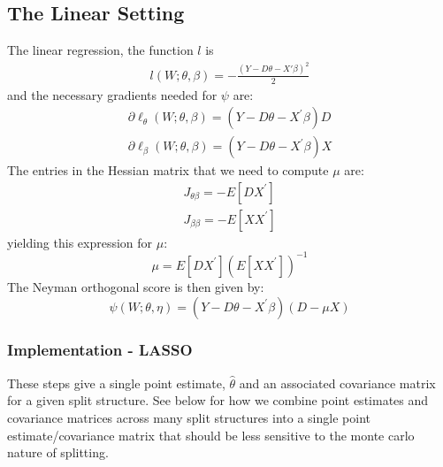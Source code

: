 \documentclass[11pt]{article}
\begin{document}
\subsection{The Linear Setting}
The linear regression, the function $l$ is
\begin{gather*}
	l(W; \theta, \beta) = -\frac{(Y - D\theta - X'\beta)^2}{2}
\end{gather*}
and the necessary gradients needed for $\psi$ are:
\begin{gather*}
	\partial \ell_{\theta}(W ; \theta, \beta)=\left(Y-D \theta-X^{\prime} \beta\right) D \\
  \partial \ell_{\beta}(W ; \theta, \beta)=\left(Y-D \theta-X^{\prime} \beta\right) X
\end{gather*}
The entries in the Hessian matrix that we need to compute $\mu$ are:
\begin{gather*}
	J_{\theta \beta}=-E\left[D X^{\prime}\right] \\
  J_{\beta \beta}=-E\left[X X^{\prime}\right]
\end{gather*}
yielding this expression for $\mu$:
$$	\mu = E\left[D X^{\prime}\right]\left(E\left[X X^{\prime}\right]\right)^{-1}$$
The Neyman orthogonal score is then given by:
$$ \psi(W ; \theta, \eta)=\left(Y-D \theta-X^{\prime} \beta\right)(D-\mu X) $$

\subsubsection{Implementation - LASSO}
These steps give a single point estimate, $\hat{\theta}$ and an associated covariance matrix for a given split structure.  See below for how we combine point estimates and covariance matrices across many split structures into a single point estimate/covariance matrix that should be less sensitive to the monte carlo nature of splitting.
\end{document}
